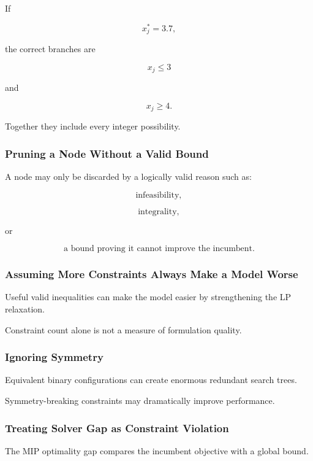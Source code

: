 If

\[
x_j^*=3.7,
\]

the correct branches are

\[
x_j\leq3
\]

and

\[
x_j\geq4.
\]

Together they include every integer possibility.

\subsubsection{Pruning a Node Without a Valid Bound}

A node may only be discarded by a logically valid reason such as:

\[
\boxed{
\text{infeasibility},
}
\]

\[
\boxed{
\text{integrality},
}
\]

or

\[
\boxed{
\text{a bound proving it cannot improve the incumbent}.
}
\]

\subsubsection{Assuming More Constraints Always Make a Model Worse}

Useful valid inequalities can make the model easier by strengthening the
LP relaxation.

Constraint count alone is not a measure of formulation quality.

\subsubsection{Ignoring Symmetry}

Equivalent binary configurations can create enormous redundant search
trees.

Symmetry-breaking constraints may dramatically improve performance.

\subsubsection{Treating Solver Gap as Constraint Violation}

The MIP optimality gap compares the incumbent objective with a global
bound.


